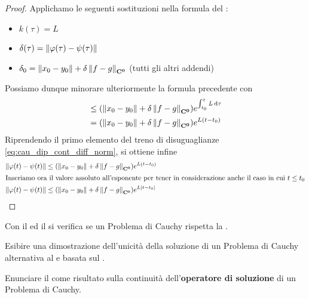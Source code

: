 \begin{theorem}
\begin{proof}
		Applichamo le seguenti sostituzioni nella formula del :
		\begin{itemize}
			\item $k(\tau) = L$
			\item $\delta(\tau) = \left\|\varphi(\tau) - \psi(\tau)\right\|$
			\item $\delta_0 = \left\|x_0 - y_0\right\| + \delta\left\|f-g\right\|_{\mathbf{C^{0}}}$ (tutti gli altri addendi)
		\end{itemize}
		Possiamo dunque minorare ulteriormente la formula precedente con
		\begin{align*}
			&\leq (\left\|x_0 - y_0\right\| + \delta\left\|f-g\right\|_{\mathbf{C^{0}}}) e^{\int_{t_0}^{t}L\,\mathrm{d}{\tau}}\\
			&= (\left\|x_0 - y_0\right\| + \delta\left\|f-g\right\|_{\mathbf{C^{0}}}) e^{L(t-t_0)}
		\end{align*}
		Riprendendo il primo elemento del treno di disuguaglianze \cref{eq:cau_dip_cont_diff_norm}, si ottiene infine
		\begin{align*}
			\left\|\varphi(t)-\psi(t)\right\| &\leq (\left\|x_0 - y_0\right\| + \delta\left\|f-g\right\|_{\mathbf{C^{0}}}) e^{L(t-t_0)}\\
			\intertext{Inseriamo ora il valore assoluto all'esponente per tener in considerazione anche il caso in cui $t \leq t_0$}
			\left\|\varphi(t)-\psi(t)\right\| &\leq (\left\|x_0 - y_0\right\| + \delta\left\|f-g\right\|_{\mathbf{C^{0}}}) e^{L\left|t-t_0\right|}
		\end{align*}
	\end{proof}
\end{theorem}
\begin{note}
	Con il  ed il  si verifica se un Problema di Cauchy rispetta la .
\end{note}
\begin{exercise}
	Esibire una dimostrazione dell'unicità della soluzione di un Problema di Cauchy alternativa al  e basata sul .
\end{exercise}
\begin{exercise}
	Enunciare il  come risultato sulla continuità dell'\textbf{operatore di soluzione} di un Problema di Cauchy.
\end{exercise}
